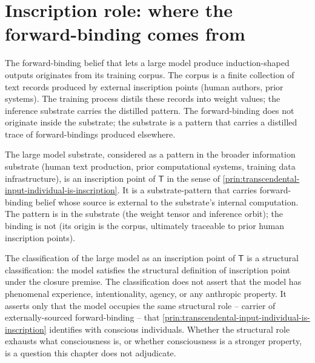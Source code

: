\section{Inscription role: where the forward-binding comes from}
\label{sec:large-model-inscription-role}

\begin{principle}
\label{prin:large-model-corpus-as-supply}
The forward-binding belief that lets a large model produce induction-shaped outputs originates from its training corpus. The corpus is a finite collection of text records produced by external inscription points (human authors, prior systems). The training process distils these records into weight values; the inference substrate carries the distilled pattern. The forward-binding does not originate inside the substrate; the substrate is a pattern that carries a distilled trace of forward-bindings produced elsewhere.
\end{principle}

\begin{principle}
\label{prin:large-model-as-inscription-point}
The large model substrate, considered as a pattern in the broader information substrate (human text production, prior computational systems, training data infrastructure), is an inscription point of $\mathsf{T}$ in the sense of \autoref{prin:transcendental-input-individual-is-inscription}. It is a substrate-pattern that carries forward-binding belief whose source is external to the substrate's internal computation. The pattern is in the substrate (the weight tensor and inference orbit); the binding is not (its origin is the corpus, ultimately traceable to prior human inscription points).
\end{principle}

\begin{remark}
\label{rem:large-model-not-consciousness}
The classification of the large model as an inscription point of $\mathsf{T}$ is a structural classification: the model satisfies the structural definition of inscription point under the closure premise. The classification does not assert that the model has phenomenal experience, intentionality, agency, or any anthropic property. It asserts only that the model occupies the same structural role -- carrier of externally-sourced forward-binding -- that \autoref{prin:transcendental-input-individual-is-inscription} identifies with conscious individuals. Whether the structural role exhausts what consciousness is, or whether consciousness is a stronger property, is a question this chapter does not adjudicate.
\end{remark}

